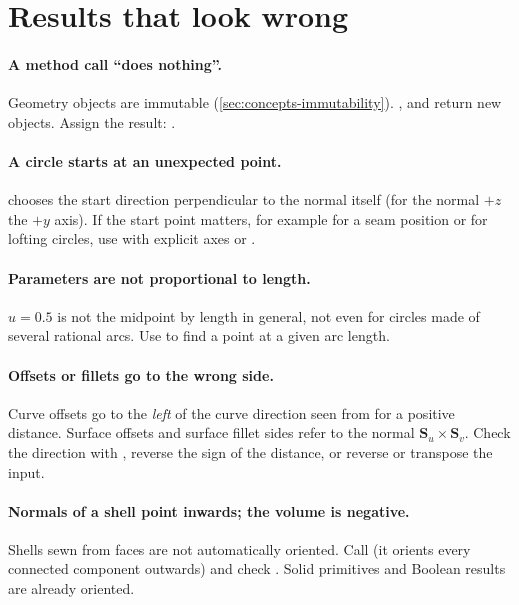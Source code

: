 \section{Results that look wrong}\label{sec:ts-wrong}

\paragraph{A method call ``does nothing''.}
Geometry objects are immutable (\cref{sec:concepts-immutability}). ,
 and  return new objects. Assign the result:
.

\paragraph{A circle starts at an unexpected point.}
 chooses the start direction perpendicular to the normal itself (for the
normal $+z$ the $+y$ axis). If the start point matters, for example for a seam position or for
lofting circles, use  with explicit axes or .

\paragraph{Parameters are not proportional to length.}
$u=0.5$ is not the midpoint by length in general, not even for circles made of several rational
arcs. Use  to find a point at a given arc length.

\paragraph{Offsets or fillets go to the wrong side.}
Curve offsets go to the \emph{left} of the curve direction seen from  for a
positive distance. Surface offsets and surface fillet sides refer to the normal
$\mathbf S_u\times\mathbf S_v$. Check the direction with , reverse the
sign of the distance, or reverse or transpose the input.

\paragraph{Normals of a shell point inwards; the volume is negative.}
Shells sewn from faces are not automatically oriented. Call  (it orients
every connected component outwards) and check . Solid
primitives and Boolean results are already oriented.

